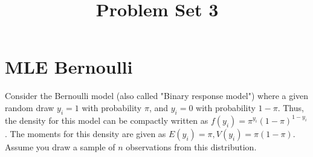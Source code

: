 \documentclass[11pt,reqno]{amsart}   %
\newcommand{\ksp}{\vspace{0.1in}}   %
\newcommand{\kl}{\left(}
\newcommand{\kr}{\right)}
\begin{document}


\title{Problem Set 3}
\author{} %
\maketitle %



\section{MLE Bernoulli}
Consider the Bernoulli model (also called "Binary response model") where a given random draw $y_i = 1$ with probability $\pi$, 
and $y_i = 0$ with probability $1-\pi$.  
Thus, the density for this model can be compactly written as $f\kl y_i \kr =\pi^{y_i}\kl 1-\pi \kr^{1-y_i}$.  
The moments for this density are given as $E\kl y_i \kr = \pi, V\kl y_i \kr =\pi\kl 1-\pi \kr$. 
Assume you draw a sample of $n$ observations from this distribution.
\ksp
\end{document}
